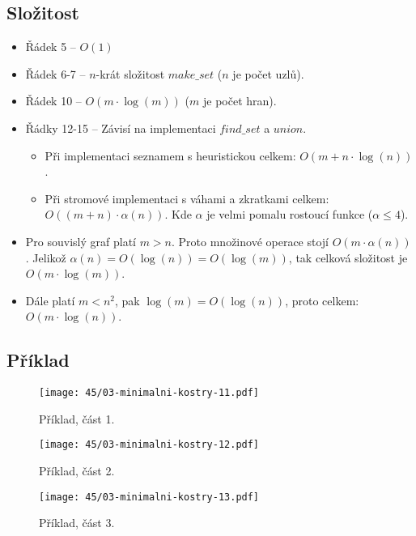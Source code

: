 \subsection*{Složitost}

\begin{itemize}
    \item Řádek 5 -- $O(1)$
    \item Řádek 6-7 -- $n$-krát složitost $make\_set$ ($n$ je počet uzlů).
    \item Řádek 10 -- $O(m \cdot \log(m))$ ($m$ je počet hran).
    \item Řádky 12-15 -- Závisí na implementaci $find\_set$ a $union$.
    \begin{itemize}
        \item Při implementaci seznamem s heuristickou celkem: $O(m + n \cdot \log(n))$.
        \item Při stromové implementaci s váhami a zkratkami celkem: $O((m+n) \cdot \alpha(n))$. Kde $\alpha$ je velmi pomalu rostoucí funkce ($\alpha \leq 4$).
    \end{itemize}
    \item Pro souvislý graf platí $m > n$. Proto množinové operace stojí $O(m \cdot \alpha(n))$. Jelikož $\alpha(n) = O(\log(n)) = O(\log(m))$, tak celková složitost je $O(m \cdot \log(m))$.
    \item Dále platí $m < n^2$, pak $\log(m) = O(\log(n))$, proto celkem: $O(m \cdot \log(n))$.
\end{itemize}

\subsection*{Příklad}

\begin{figure}[H]
    \centering
    \texttt{[image: 45/03-minimalni-kostry-11.pdf]}
    \caption{Příklad, část 1.}
\end{figure}

\begin{figure}[H]
    \centering
    \texttt{[image: 45/03-minimalni-kostry-12.pdf]}
    \caption{Příklad, část 2.}
\end{figure}

\begin{figure}[H]
    \centering
    \texttt{[image: 45/03-minimalni-kostry-13.pdf]}
    \caption{Příklad, část 3.}
\end{figure}

